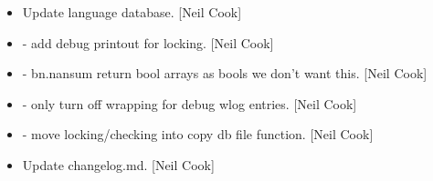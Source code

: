\documentclass[a4paper,10pt,english]{report}
\begin{document}
\begin{itemize}
\item {} 
Update language database. {[}Neil Cook{]}

\item {} 
 - add debug printout for locking. {[}Neil Cook{]}

\item {} 
 - bn.nansum return bool arrays as bools we don’t
want this. {[}Neil Cook{]}

\item {} 
 - only turn off wrapping for debug wlog entries.
{[}Neil Cook{]}

\item {} 
 - move locking/checking into copy db file
function. {[}Neil Cook{]}

\item {} 
Update changelog.md. {[}Neil Cook{]}

\end{itemize}
\end{document}
